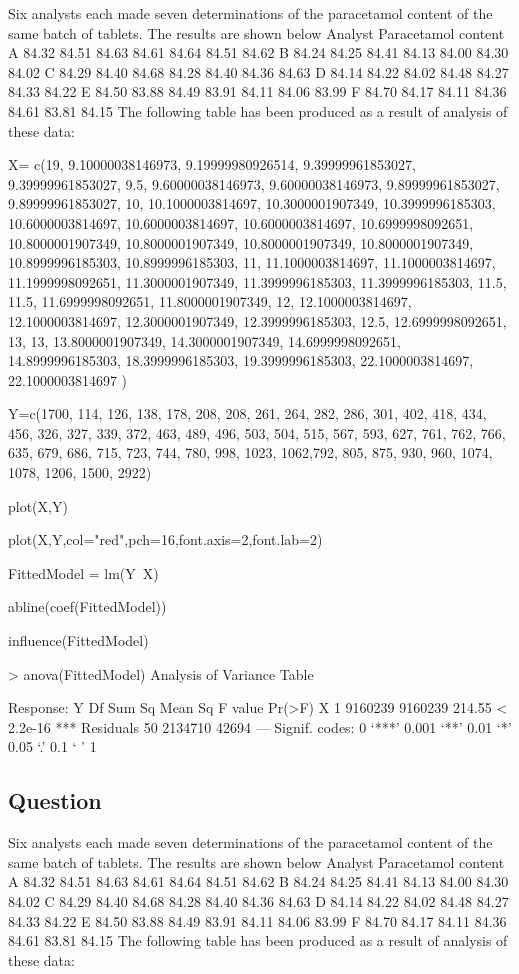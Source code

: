 Six analysts each made seven determinations of the paracetamol content of the same batch of tablets.
The results are shown below
Analyst Paracetamol content
A 84.32 84.51 84.63 84.61 84.64 84.51 84.62
B 84.24 84.25 84.41 84.13 84.00 84.30 84.02
C 84.29 84.40 84.68 84.28 84.40 84.36 84.63
D 84.14 84.22 84.02 84.48 84.27 84.33 84.22
E 84.50 83.88 84.49 83.91 84.11 84.06 83.99
F 84.70 84.17 84.11 84.36 84.61 83.81 84.15
The following table has been produced as a result of analysis of these data:




X= c(19, 9.10000038146973, 9.19999980926514, 9.39999961853027, 9.39999961853027, 
9.5, 9.60000038146973, 9.60000038146973, 9.89999961853027, 9.89999961853027, 
10, 10.1000003814697, 10.3000001907349, 10.3999996185303, 10.6000003814697, 
10.6000003814697, 10.6000003814697, 10.6999998092651, 10.8000001907349, 
10.8000001907349, 10.8000001907349, 10.8000001907349, 10.8999996185303, 
10.8999996185303, 11, 11.1000003814697, 11.1000003814697, 11.1999998092651, 
11.3000001907349, 11.3999996185303, 11.3999996185303, 11.5, 11.5, 
11.6999998092651, 11.8000001907349, 12, 12.1000003814697, 12.1000003814697, 
12.3000001907349, 12.3999996185303, 12.5, 12.6999998092651, 13, 
13, 13.8000001907349, 14.3000001907349, 14.6999998092651, 14.8999996185303, 
18.3999996185303, 19.3999996185303, 22.1000003814697, 22.1000003814697
)


Y=c(1700, 114, 126, 138, 178, 208, 208, 261, 264, 282, 286, 301, 
402, 418, 434, 456, 326, 327, 339, 372,  463, 489, 496, 503, 504, 
515, 567, 593, 627, 761, 762, 766,  635, 679, 686, 715, 723, 744, 
780, 998, 1023, 1062,792, 805, 875, 930, 960,  1074, 1078, 1206, 
1500, 2922)

plot(X,Y)

plot(X,Y,col="red",pch=16,font.axis=2,font.lab=2)

FittedModel = lm(Y~X)

abline(coef(FittedModel))

influence(FittedModel)


> anova(FittedModel)
Analysis of Variance Table

Response: Y
          	Df  	Sum Sq 	Mean Sq 	F value    	Pr(>F)    
X         	 1 	9160239 	9160239 	 214.55 	< 2.2e-16 ***
Residuals 	50 	2134710   	42694                      
---
Signif. codes:  0 ‘***’ 0.001 ‘**’ 0.01 ‘*’ 0.05 ‘.’ 0.1 ‘ ’ 1 


\subsection{Question}
Six analysts each made seven determinations of the paracetamol content of the same batch of tablets.
The results are shown below
Analyst Paracetamol content
A 84.32 84.51 84.63 84.61 84.64 84.51 84.62
B 84.24 84.25 84.41 84.13 84.00 84.30 84.02
C 84.29 84.40 84.68 84.28 84.40 84.36 84.63
D 84.14 84.22 84.02 84.48 84.27 84.33 84.22
E 84.50 83.88 84.49 83.91 84.11 84.06 83.99
F 84.70 84.17 84.11 84.36 84.61 83.81 84.15
The following table has been produced as a result of analysis of these data:




